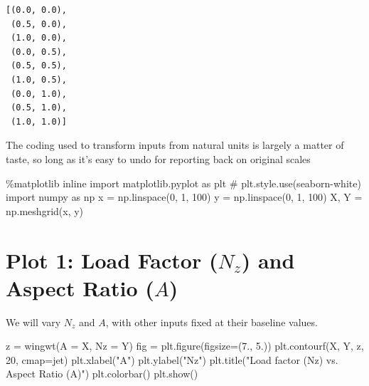 \documentclass[
  letterpaper,
  DIV=11,
  numbers=noendperiod]{scrreprt}
\newenvironment{Shaded}{\begin{snugshade}}{\end{snugshade}}
\newcommand{\CommentTok}[1]{\textcolor[rgb]{0.37,0.37,0.37}{#1}}
\newcommand{\DecValTok}[1]{\textcolor[rgb]{0.68,0.00,0.00}{#1}}
\newcommand{\FloatTok}[1]{\textcolor[rgb]{0.68,0.00,0.00}{#1}}
\newcommand{\ImportTok}[1]{\textcolor[rgb]{0.00,0.46,0.62}{#1}}
\newcommand{\NormalTok}[1]{\textcolor[rgb]{0.00,0.23,0.31}{#1}}
\newcommand{\OperatorTok}[1]{\textcolor[rgb]{0.37,0.37,0.37}{#1}}
\newcommand{\StringTok}[1]{\textcolor[rgb]{0.13,0.47,0.30}{#1}}
\begin{document}
\begin{verbatim}
[(0.0, 0.0),
 (0.5, 0.0),
 (1.0, 0.0),
 (0.0, 0.5),
 (0.5, 0.5),
 (1.0, 0.5),
 (0.0, 1.0),
 (0.5, 1.0),
 (1.0, 1.0)]
\end{verbatim}

The coding used to transform inputs from natural units is largely a
matter of taste, so long as it's easy to undo for reporting back on
original scales

\begin{Shaded}
\begin{Highlighting}[]
\OperatorTok{\%}\NormalTok{matplotlib inline}
\ImportTok{import}\NormalTok{ matplotlib.pyplot }\ImportTok{as}\NormalTok{ plt}
\CommentTok{\# plt.style.use(\textquotesingle{}seaborn{-}white\textquotesingle{})}
\ImportTok{import}\NormalTok{ numpy }\ImportTok{as}\NormalTok{ np}
\NormalTok{x }\OperatorTok{=}\NormalTok{ np.linspace(}\DecValTok{0}\NormalTok{, }\DecValTok{1}\NormalTok{, }\DecValTok{100}\NormalTok{)}
\NormalTok{y }\OperatorTok{=}\NormalTok{ np.linspace(}\DecValTok{0}\NormalTok{, }\DecValTok{1}\NormalTok{, }\DecValTok{100}\NormalTok{)}
\NormalTok{X, Y }\OperatorTok{=}\NormalTok{ np.meshgrid(x, y)}
\end{Highlighting}
\end{Shaded}

\hypertarget{plot-1-load-factor-n_z-and-aspect-ratio-a}{%
\section{\texorpdfstring{Plot 1: Load Factor (\(N_z\)) and Aspect Ratio
(\(A\))}{Plot 1: Load Factor (N\_z) and Aspect Ratio (A)}}\label{plot-1-load-factor-n_z-and-aspect-ratio-a}}

We will vary \(N_z\) and \(A\), with other inputs fixed at their
baseline values.

\begin{Shaded}
\begin{Highlighting}[]
\NormalTok{z }\OperatorTok{=}\NormalTok{ wingwt(A }\OperatorTok{=}\NormalTok{ X, Nz }\OperatorTok{=}\NormalTok{ Y)}
\NormalTok{fig }\OperatorTok{=}\NormalTok{ plt.figure(figsize}\OperatorTok{=}\NormalTok{(}\FloatTok{7.}\NormalTok{, }\FloatTok{5.}\NormalTok{))}
\NormalTok{plt.contourf(X, Y, z, }\DecValTok{20}\NormalTok{, cmap}\OperatorTok{=}\StringTok{\textquotesingle{}jet\textquotesingle{}}\NormalTok{)}
\NormalTok{plt.xlabel(}\StringTok{"A"}\NormalTok{)}
\NormalTok{plt.ylabel(}\StringTok{"Nz"}\NormalTok{)}
\NormalTok{plt.title(}\StringTok{"Load factor (Nz) vs. Aspect Ratio (A)"}\NormalTok{)}
\NormalTok{plt.colorbar()}
\NormalTok{plt.show()}
\end{Highlighting}
\end{Shaded}
\end{document}
